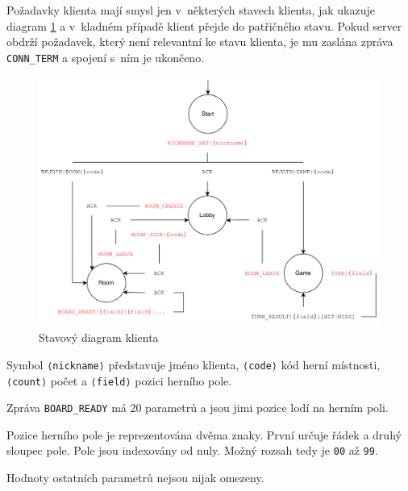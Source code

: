 \documentclass[a4paper, 12pt]{report}
\begin{document}
Požadavky klienta mají smysl jen v~některých stavech klienta, jak ukazuje diagram \ref{fig:client-state} a v~kladném případě klient přejde do patřičného stavu. Pokud server obdrží požadavek, který není relevantní ke stavu klienta, je mu zaslána zpráva \texttt{CONN\_TERM} a spojení s~ním je ukončeno.

\begin{figure}
    \centering
    \includegraphics[width=\textwidth]{img/client-state.drawio}
    \caption{Stavový diagram klienta}
    \label{fig:client-state}
\end{figure}

Symbol \texttt{⟨nickname⟩} představuje jméno klienta, \texttt{⟨code⟩} kód herní místnosti, \texttt{⟨count⟩} počet a \texttt{⟨field⟩} pozici herního pole.

Zpráva \texttt{BOARD\_READY} má 20 parametrů a jsou jimi pozice lodí na herním poli.

Pozice herního pole je reprezentována dvěma znaky. První určuje řádek a druhý sloupec pole. Pole jsou indexovány od nuly. Možný rozsah tedy je \texttt{00} až \texttt{99}.

Hodnoty ostatních parametrů nejsou nijak omezeny.
\end{document}
